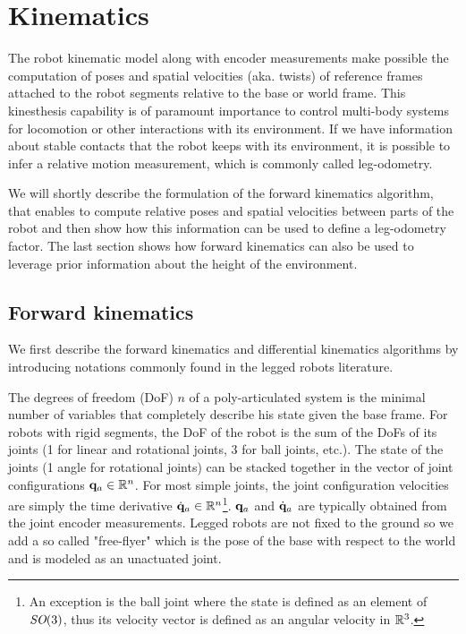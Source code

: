 \chapter{Kinematics}
\minitoc
\bigskip

The robot kinematic model along with encoder measurements make possible the computation of poses and spatial velocities \cite{featherstone2014rigid} (aka. twists) 
of reference frames attached to the robot segments relative to the base or world frame. This kinesthesis capability is of paramount importance to control
multi-body systems for locomotion or other interactions with its environment. If we have information about stable contacts that the robot keeps with
its environment, it is possible to infer a relative motion measurement, which is commonly called leg-odometry.

We will shortly describe the formulation of the forward kinematics algorithm, that enables to compute relative poses and spatial velocities between parts of the robot
and then show how this information can be used to define a leg-odometry factor. The last section shows how forward kinematics can also be used to leverage prior 
information about the height of the environment. 



\section{Forward kinematics}
\label{sec:forward_kinematics}
We first describe the forward kinematics and differential kinematics algorithms by introducing notations commonly found in the legged robots literature.

The degrees of freedom (DoF) $n$ of a poly-articulated system is the minimal number of variables that completely describe his state given the base frame. 
For robots with rigid segments, the DoF of the robot is the sum of the DoFs of its joints (1 for linear and rotational joints, 3 for
ball joints, etc.).
The state of the joints (1 angle for rotational joints) can be stacked together in the vector of joint configurations 
${\bf q}_a \in \mathbb{R}^n$. For most simple joints, the joint configuration velocities are simply the time derivative $\dot{{\bf q}}_a \in \mathbb{R}^n$\footnote{An exception is the ball joint where the 
state is defined as an element of $\textit{SO}(3)$, thus its velocity vector is defined as an angular velocity in $\mathbb{R}^3$.}. ${\bf q}_a$ and $\dot{{\bf q}}_a$ are typically obtained from
the joint encoder measurements.
Legged robots are not fixed to the ground so we add a so called "free-flyer" which is the pose of the base with respect to the world and is modeled as an unactuated joint. 

